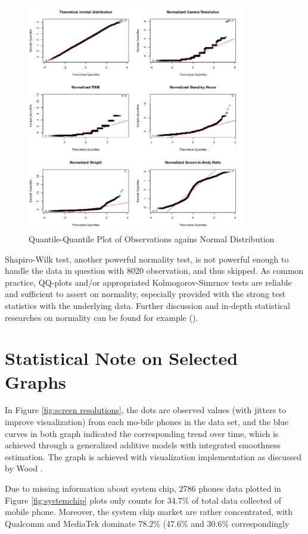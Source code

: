 \documentclass[utf8,english]{gradu3}
\begin{document}
\begin{figure}[htb]
    \centering
    \includegraphics[width=0.85\textwidth]{qqplots.png}
    \caption{Quantile-Quantile Plot of Observations agains Normal Distribution}
    \label{fig:qqplots}
\end{figure}

Shapiro-Wilk test, another powerful normality test, is not powerful enough to handle the data in question with 8020 observation, and thus skipped. As common practice, QQ-plots and/or appropriated Kolmogorov-Simrnov tests are reliable and sufficient to assert on normality, especially provided with the strong test statistics with the underlying data. Further discussion and in-depth statistical researches on normality can be found for example \citeauthor{ghasemi2012normality} (\citeauthor{ghasemi2012normality}).

\section{Statistical Note on Selected Graphs}
\label{app:stats note}

In Figure \ref{fig:screen resolutions}, the dots are observed values (with jitters to improve visualization) from each mo-bile phones in the data set, and the blue curves in both graph indicated the corresponding trend over time, which is achieved through a generalized additive models with integrated smoothness estimation. The graph is achieved with visualization implementation as discussed by Wood \citeyear{wood2001mgcv}.

Due to missing information about system chip, 2786 phones data plotted in Figure \ref{fig:systemchip} plots only counts for 34.7\% of total data collected of mobile phone. Moreover, the system chip market are rather concentrated, with Qualcomm and MediaTek dominate 78.2\% (47.6\% and 30.6\% correspondingly
\end{document}
